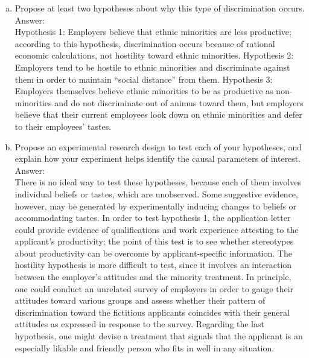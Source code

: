 \documentclass[11pt,notitlepage]{article}\usepackage[]{graphicx}\usepackage[]{color}
\begin{document}
\begin{enumerate}[a)]
\item Propose at least two hypotheses about why this type of discrimination occurs. \\
Answer:\\
Hypothesis 1: Employers believe that ethnic minorities are less productive; according to this hypothesis, discrimination occurs because of rational economic calculations, not hostility toward ethnic minorities. Hypothesis 2: Employers tend to be hostile to ethnic minorities and discriminate against them in order to maintain ``social distance'' from them.  Hypothesis 3: Employers themselves believe ethnic minorities to be as productive as non-minorities and do not discriminate out of animus toward them, but employers believe that their current employees look down on ethnic minorities and defer to their employees' tastes.

\item Propose an experimental research design to test each of your hypotheses, and explain how your experiment helps identify the causal parameters of interest.\\
Answer:\\
There is no ideal way to test these hypotheses, because each of them involves individual beliefs or tastes, which are unobserved. Some suggestive evidence, however, may be generated by experimentally inducing changes to beliefs or accommodating tastes. In order to test hypothesis 1, the application letter could provide evidence of qualifications and work experience attesting to the applicant's productivity; the point of this test is to see whether stereotypes about productivity can be overcome by applicant-specific information. The hostility hypothesis is more difficult to test, since it involves an interaction between the employer's attitudes and the minority treatment. In principle, one could conduct an unrelated survey of employers in order to gauge their attitudes toward various groups and assess whether their pattern of discrimination toward the fictitious applicants coincides with their general attitudes as expressed in response to the survey. Regarding the last hypothesis, one might devise a treatment that signals that the applicant is an especially likable and friendly person who fits in well in any situation.  



\end{enumerate}
\end{document}
